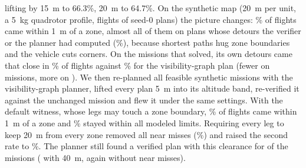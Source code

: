 lifting by 15~m to 66.3\%, 20~m to 64.7\%. On the synthetic map (20~m per unit, a 5~kg quadrotor profile, \NSynSimFlights{} flights of seed-0 plans) the picture changes: \NSynSimNear\% of flights came within 1~m of a zone, almost all of them on plans whose detours the verifier or the planner had computed (\NSynSimNearVerifierDetours\%), because shortest paths hug zone boundaries and the vehicle cuts corners. On the \NSynSimSameMissions{} missions that \cfull{} solved, its own detours came that close in \NSynSimNearCfull\% of flights against \NSynSimSameNearE\% for the visibility-graph plan (fewer on \NSynSimCfullLess{} missions, more on \NSynSimCfullMore). We then re-planned all \NClrMissions{} feasible synthetic missions with the visibility-graph planner, lifted every plan 5~m into its altitude band, re-verified it against the unchanged mission and flew it under the same settings. With the default witness, whose legs may touch a zone boundary, \NClrDefaultNear\% of flights came within 1~m of a zone and \NClrDefaultLTwo\% stayed within all modeled limits. Requiring every leg to keep 20~m from every zone removed all near misses (\NClrTwentyNear\%) and raised the second rate to \NClrTwentyLTwo\%. The planner still found a verified plan with this clearance for \NClrTwentyAdm{} of the \NClrMissions{} missions (\NClrFortyAdm{} with 40~m, again without near misses).
